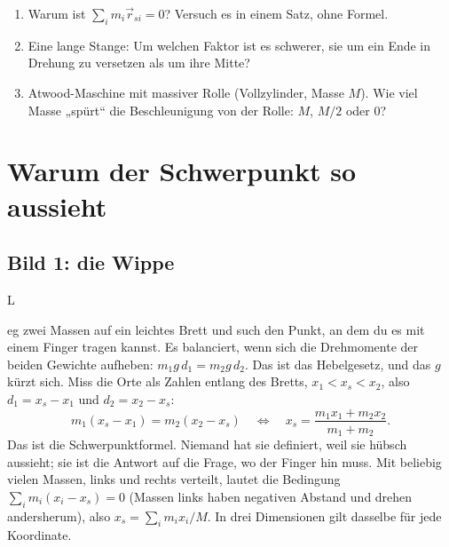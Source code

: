\documentclass[deutsch]{kaelearn}
\begin{document}
\begin{guessfirst}
\begin{enumerate}
  \item Warum ist $\sum_i m_i\vec r_{si} = 0$? Versuch es in einem Satz, ohne Formel.
  \item Eine lange Stange: Um welchen Faktor ist es schwerer, sie um ein Ende in Drehung zu versetzen als um ihre Mitte?
  \item Atwood-Maschine mit massiver Rolle (Vollzylinder, Masse $M$). Wie viel Masse „spürt“ die Beschleunigung von der Rolle: $M$, $M/2$ oder $0$?
\end{enumerate}
\end{guessfirst}

\begin{terms}
\end{terms}

\section{Warum der Schwerpunkt so aussieht}

\subsection{Bild 1: die Wippe}
\opening{L}{eg zwei} Massen auf ein leichtes Brett und such den Punkt, an dem du es mit einem Finger tragen kannst. Es balanciert, wenn sich
die Drehmomente der beiden Gewichte aufheben: $m_1g\,d_1 = m_2g\,d_2$. Das ist das Hebelgesetz, und das $g$ kürzt sich. Miss die Orte als
Zahlen entlang des Bretts, $x_1 < x_s < x_2$, also $d_1 = x_s - x_1$ und $d_2 = x_2 - x_s$:
\[
  m_1(x_s - x_1) = m_2(x_2 - x_s) \quad\Longleftrightarrow\quad x_s = \frac{m_1x_1 + m_2x_2}{m_1 + m_2}.
\]
Das ist die Schwerpunktformel. Niemand hat sie definiert, weil sie hübsch aussieht; sie ist die Antwort auf die Frage, wo der Finger
hin muss. Mit beliebig vielen Massen, links und rechts verteilt, lautet die Bedingung $\sum_i m_i(x_i - x_s) = 0$ (Massen links haben
negativen Abstand und drehen andersherum), also $x_s = \sum_i m_ix_i/M$. In drei Dimensionen gilt dasselbe für jede Koordinate.
\end{document}
